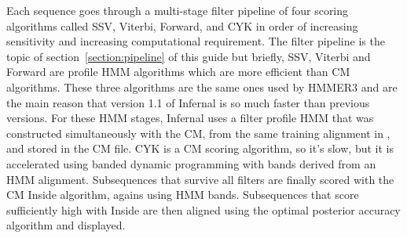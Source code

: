 Each sequence goes through a multi-stage filter pipeline of four
scoring algorithms called SSV, Viterbi, Forward, and CYK in order of
increasing sensitivity and increasing computational requirement.  The
filter pipeline is the topic of section~\ref{section:pipeline} of this
guide but briefly, SSV, Viterbi and Forward are profile
HMM algorithms which are more efficient than CM algorithms. These
three algorithms are the same ones used by HMMER3 and are the main
reason that version 1.1 of Infernal is so much faster than previous
versions. For these HMM stages, Infernal uses a filter profile HMM
that was constructed simultaneously with the CM, from the same
training alignment in , and stored in the CM file. CYK
is a CM scoring algorithm, so it's slow, but it is accelerated using
banded dynamic programming with bands derived from an HMM
alignment. Subsequences that survive all filters are finally scored
with the CM Inside algorithm, agains using HMM bands. Subsequences
that score sufficiently high with Inside are then aligned using the
optimal posterior accuracy algorithm and displayed.

